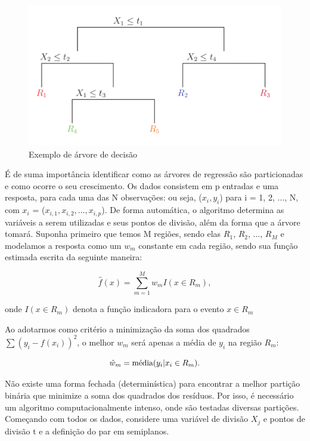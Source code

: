 \documentclass[
	12pt,				%
	a4paper,		%
	oneside,    %
	chapter=TITLE,		   %
	section=TITLE,		   %
	subsection=TITLE,	   %
	subsubsection=TITLE, %
	english,			%
	french,				%
	spanish,			%
	brazil,				%
]{abntex2}
\begin{document}
\begin{figure}
\centering
\includegraphics[width=\textwidth,height=0.3\textheight]{../fig/arvore_decisao.png}
\caption{Exemplo de árvore de decisão\label{fig:tree}}
\end{figure}

É de suma importância identificar como as árvores de regressão são
particionadas e como ocorre o seu crescimento. Os dados consistem em p
entradas e uma resposta, para cada uma das N observações: ou seja,
(\(x_i,y_i\)) para i = 1, 2, \(\dots\), N, com \(x_i\) =
(\(x_{i,1}, x_{i,2}, \dots, x_{i,p}\)). De forma automática, o algoritmo
determina as variáveis a serem utilizadas e seus pontos de divisão, além
da forma que a árvore tomará. Suponha primeiro que temos M regiões,
sendo elas \(R_1\), \(R_2\), \(\dots\), \(R_M\) e modelamos a resposta
como um \(w_m\) constante em cada região, sendo sua função estimada
escrita da seguinte maneira:

\[
\hat{f}(x) = \sum^M_{m=1}w_m I(x \in R_m),
\]

\noindent onde \(I(x \in R_m)\) denota a função indicadora para o evento
\({x \in R_m}\)

Ao adotarmos como critério a minimização da soma dos quadrados
\(\sum (y_i - f(x_i))^2\), o melhor \(w_m\) será apenas a média de
\(y_i\) na região \(R_m\):

\[\hat{w}_m= \hbox{média} (y_i|x_i \in R_m).\]

Não existe uma forma fechada (determinística) para encontrar a melhor
partição binária que minimize a soma dos quadrados dos resíduos. Por
isso, é necessário um algoritmo computacionalmente intenso, onde são
testadas diversas partições. Começando com todos os dados, considere uma
variável de divisão \(X_j\) e pontos de divisão t e a definição do par
em semiplanos.
\end{document}
